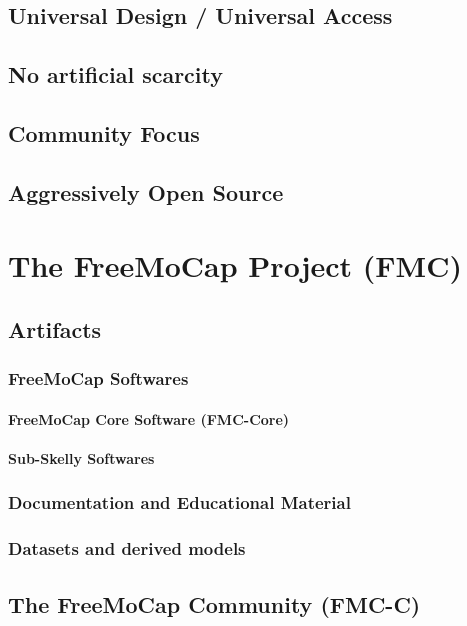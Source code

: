 \documentclass[11pt]{article}
\begin{document}
\subsection{Universal Design / Universal Access}
\subsection{No artificial scarcity}
\subsection{Community Focus}
\subsection{Aggressively Open Source}


\section{The FreeMoCap Project (FMC)}

\subsection{Artifacts}

\subsubsection{FreeMoCap Softwares}
\paragraph{FreeMoCap Core Software (FMC-Core)}
\paragraph{Sub-Skelly Softwares}

\subsubsection{Documentation and Educational Material}

\subsubsection{Datasets and derived models}


\subsection{The FreeMoCap Community (FMC-C)}
\end{document}
